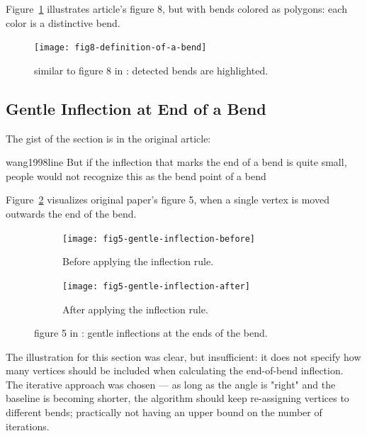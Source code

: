 \documentclass[a4paper]{article}
\begin{document}
Figure~\ref{fig:fig8-definition-of-a-bend} illustrates article's figure 8,
but with bends colored as polygons: each color is a distinctive bend.

\begin{figure}[ht]
    \centering
    \texttt{[image: fig8-definition-of-a-bend]}

    \caption{similar to figure 8 in \cite{wang1998line}: detected bends are
    highlighted.}

    \label{fig:fig8-definition-of-a-bend}
\end{figure}

\subsection{Gentle Inflection at End of a Bend}

The gist of the section is in the original article:

\begin{displaycquote}{wang1998line}
    But if the inflection that marks the end of a bend is quite small, people
    would not recognize this as the bend point of a bend
\end{displaycquote}

Figure~\ref{fig:fig5-gentle-inflection} visualizes original paper's figure 5,
when a single vertex is moved outwards the end of the bend.

\begin{figure}[ht]
    \centering
    \begin{subfigure}[b]{.49\textwidth}
        \texttt{[image: fig5-gentle-inflection-before]}
        \caption{Before applying the inflection rule.}
    \end{subfigure}
    \hfill
    \begin{subfigure}[b]{.49\textwidth}
        \texttt{[image: fig5-gentle-inflection-after]}
        \caption{After applying the inflection rule.}
    \end{subfigure}
    \caption{figure 5 in \cite{wang1998line}: gentle inflections at the ends of
    the bend.}
    \label{fig:fig5-gentle-inflection}
\end{figure}

The illustration for this section was clear, but insufficient: it does not
specify how many vertices should be included when calculating the end-of-bend
inflection. The iterative approach was chosen --- as long as the angle is
"right" and the baseline is becoming shorter, the algorithm should keep
re-assigning vertices to different bends; practically not having an upper bound
on the number of iterations.
\end{document}
